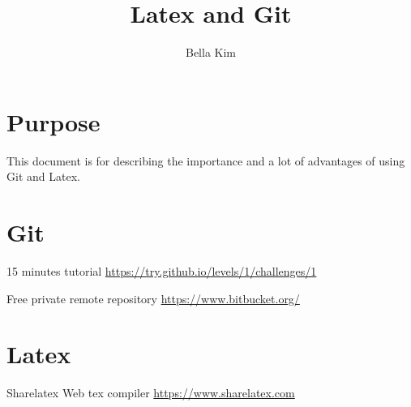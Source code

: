 \documentclass[10pt]{article}
\begin{document}
\title{Latex and Git}
\author{Bella Kim}
\date{}
\maketitle

\section{Purpose}
This document is for describing the importance and a lot of advantages of using Git and Latex.

\section{Git}

15 minutes tutorial
\url{https://try.github.io/levels/1/challenges/1}


Free private remote repository 
\url{https://www.bitbucket.org/}




\section{Latex}

Sharelatex Web tex compiler
\url{https://www.sharelatex.com}
\end{document}
